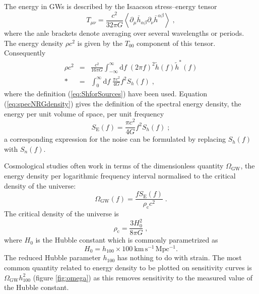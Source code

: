 The energy in GWs is described by the Isaacson stress--energy tensor \citep[section 35.15]{MTW}
\begin{equation}
T_{\mu\nu}=\frac{c^{2}}{32\pi G}\left<\partial_{\mu}\bar{h}_{\alpha\beta}\partial_{\nu}\bar{h}^{\alpha\beta}\right> \;,
\end{equation}
where the anle brackets denote averaging over several wavelengths or periods. The energy density $\rho c^{2}$ is given by the $T_{00}$ component of this tensor. Consequently
\begin{eqnarray}
\label{eq:specNRGdensity}
\rho c^{2} &=& \frac{c^{2}}{16\pi G}\int_{-\infty}^{\infty}\mathrm{d}f\;\left(2\pi f\right)^{2}\tilde{h}(f)\tilde{h}^{*}(f) \\*
 &=& \int_{0}^{\infty}\mathrm{d}f\;\frac{\pi c^{2}}{4G}f^{2}S_{h}(f)\; ,
\end{eqnarray} 
where the definition (\ref{eq:ShforSources}) have been used. Equation (\ref{eq:specNRGdensity}) gives the definition of the spectral energy density, the energy per unit volume of space, per unit frequency \citep{HellingsDowns}
\begin{equation}\label{eq:spectralenergydensity}
S_{\mathrm{E}}(f)=\frac{\pi c^{2}}{4G} f^{2}S_{h}(f) \; ;
\end{equation}
a corresponding expression for the noise can be formulated by replacing $S_h(f)$ with $S_{n}(f)$.

Cosmological studies often work in terms of the dimensionless quantity $\Omega_{\mathrm{GW}}$, the energy density per logarithmic frequency interval normalised to the critical density of the universe:
\begin{equation}
\label{eq:omega}
\Omega_\mathrm{GW}(f) = \frac{fS_{\mathrm{E}}(f)}{\rho_{\mathrm{c}}c^{2}} \; .
\end{equation}
The critical density of the universe is
\begin{equation}\label{eq:crit-density}
\rho_{\mathrm{c}}=\frac{3H_{0}^{2}}{8\pi G} \;,
\end{equation}
 where $H_{0}$ is the Hubble constant which is commonly parametrized as
\begin{equation}
H_0 =h_{100}\times 100~\mathrm{km\,s^{-1}\,Mpc^{-1}}.
\end{equation}
The reduced Hubble parameter $h_{100}$ has nothing to do with strain. The most common quantity related to energy density to be plotted on sensitivity curves is $\Omega_{\mathrm{GW}}h_{100}^{2}$ (figure \ref{fig:omega}) as this removes sensitivity to the measured value of the Hubble constant.

